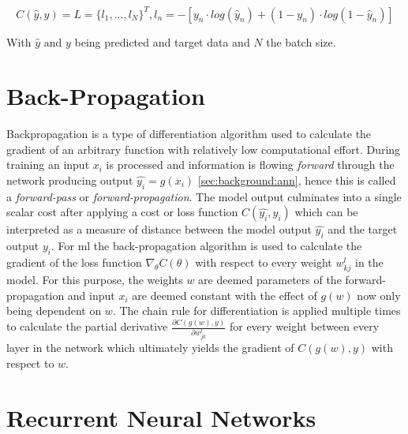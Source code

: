 \begin{equation}
C(\hat{y},y) = L = \{l_1, ..., l_N\}^T, l_n = -[y_n \cdot log(\hat{y}_n) + (1-y_n) \cdot log(1-\hat{y}_n)]
\end{equation}

With $\hat{y}$ and $y$ being predicted and target data and $N$ the batch size.

\section{Back-Propagation} \label{sec:background:backprop}

Backpropagation is a type of differentiation algorithm used to calculate the gradient of an arbitrary function with relatively low computational effort. During training an input $x_i$
is processed and information is flowing \textit{forward} through the network producing output $\hat{y_i} = g(x_i)$ \ref{sec:background:ann}, hence this is called a \textit{forward-pass} or \textit{forward-propagation}. The model output culminates into a single scalar cost after applying a cost or loss function $C(\hat{y_i}, y_i)$ which can be interpreted as a measure of distance between the model output $\hat{y_i}$ and the target output $y_i$. For \gls{ml} the back-propagation algorithm is used to calculate the gradient of the loss function $\nabla_\theta C(\theta)$ with respect to every weight $w^l_{kj}$ in the model. For this purpose, the weights $w$ are deemed parameters of the forward-propagation and input $x_i$ are deemed constant with the effect of $g(w)$ now only being dependent on $w$. The 
chain rule for differentiation is applied multiple times to calculate the partial derivative $\frac{\partial C(g(w),y)}{\partial w^l_{jk}}$ for every weight between every layer in the network which ultimately yields the gradient of $C(g(w),y)$ with respect to $w$.

\section{Recurrent Neural Networks} \label{sec:background:rnn}

